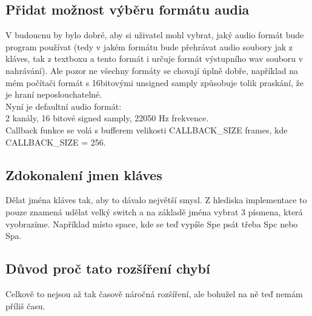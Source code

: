 \documentclass[12pt]{article}
\begin{document}
	\subsection{Přidat možnost výběru formátu audia}
	V budoucnu by bylo dobré, aby si uživatel mohl vybrat, jaký audio formát bude program používat (tedy v jakém formátu bude přehrávat audio soubory jak z kláves, tak z textboxu a tento formát i určuje formát výstupního wav souboru v nahrávání). Ale pozor ne všechny formáty se chovají úplně dobře, například na mém počítači formát s 16bitovými unsigned samply způsobuje tolik praskání, že je hraní neposlouchatelné.
	\\
	Nyní je defaultní audio formát: 
	\\
	2 kanály, 16 bitové signed samply, 22050 Hz frekvence.
	\\
	Callback funkce se volá s bufferem velikosti CALLBACK\_SIZE frames, kde CALLBACK\_SIZE = 256.
	
	\newpage
	\subsection{Zdokonalení jmen kláves}
	Dělat jména kláves tak, aby to dávalo největší smysl. Z hlediska implementace to pouze znamená udělat velký switch a na základě jména vybrat 3 písmena, která vyobrazíme. Například místo space, kde se teď vypíše Spe psát třeba Spc nebo Spa.
	\subsection{Důvod proč tato rozšíření chybí}
	Celkově to nejsou až tak časově náročná rozšíření, ale bohužel na ně teď nemám příliš času.
\end{document}
